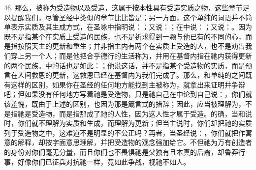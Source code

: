 46. 那么，被称为受造物以及受造，这属于按本性具有受造实质之物，这些章节足以提醒我们，尽管圣经中类似的章节比比皆是；另一方面，这个单纯的词语并不简单表示实质及其生成方式，在圣咏中指明说：；又说：；在中说：；又说：。因为既不是指某个在实质上受造的民族，也不是祈求得到一颗与他已有的不同的心，而是指按照天主的更新和重生；并非指主内有两个在实质上受造的人，也不是劝告我们穿上另一个人；而是他把合乎德行的生活称为，并用在基督内指在祂内获得更新的两个民族。中的话也是如此：；他说这话，并不是指某个受造物的实质，而是预言在人间救恩的更新，这救恩已经在基督内为我们完成了。那么，和单纯的之间既有这样的区别，如果你在圣经的任何地方能找到主被称为，就拿出来证明并争辩吧；但如果没有任何地方写着祂是受造物，只是祂自己在中论到自己说：，你们就该羞愧，既由于上述的区别，也因为那是箴言式的措辞；因此，应当被理解为，不是指祂是受造物，而是指那成了祂的人性，因为这人性才属于受造。的确，当和说时，你们就不理解为实质和生成，而理解为更新；但当主说时，你们却把祂的实质列于受造物之中，这难道不是明显的不公正吗？再者，当圣经说：，你们就把作寓意的解释，却按字面意思理解，并把受造物的观念强加给它。不但祂为万有创造者的身份对你们毫无分量，而且你们也不畏惧祂是父独有且本真的后裔，却鲁莽行事，好像你们已征兵对抗祂一样，竟如此争战，视祂不如人。\par

